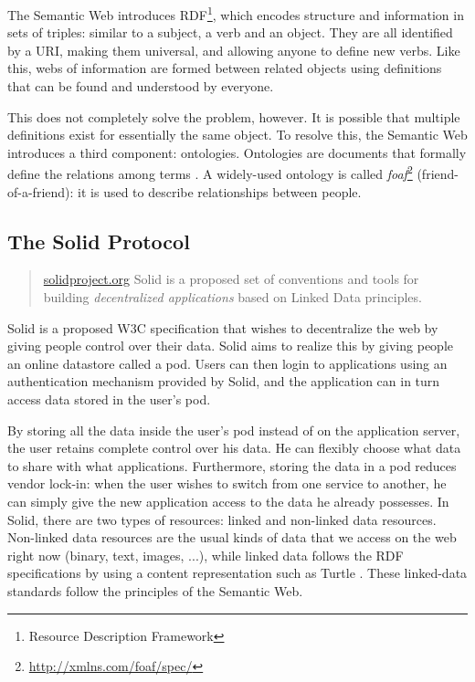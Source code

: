 \noindent The Semantic Web introduces RDF\footnote{Resource Description Framework}, which encodes structure and information in sets of triples: similar to a subject, a verb and an object. They are all identified by a URI, making them universal, and allowing anyone to define new verbs. Like this, webs of information are formed between related objects using definitions that can be found and understood by everyone.

This does not completely solve the problem, however. It is possible that multiple definitions exist for essentially the same object. To resolve this, the Semantic Web introduces a third component: ontologies. Ontologies are documents that formally define the relations among terms \citep{semantic-web}. A widely-used ontology is called \textit{foaf}\footnote{\url{ http://xmlns.com/foaf/spec/}} (friend-of-a-friend): it is used to describe relationships between people.


\subsection{The Solid Protocol}
\begin{quote}{\href{https://solidproject.org}{solidproject.org}}
    Solid is a proposed set of conventions and tools for building \textit{decentralized applications} based on Linked Data principles.
\end{quote}
\noindent Solid \citep{solid} is a proposed W3C specification that wishes to decentralize the web by giving people control over their data. Solid aims to realize this by giving people an online datastore called a pod. Users can then login to applications using an authentication mechanism provided by Solid, and the application can in turn access data stored in the user's pod.

By storing all the data inside the user's pod instead of on the application server, the user retains complete control over his data. He can flexibly choose what data to share with what applications. Furthermore, storing the data in a pod reduces vendor lock-in: when the user wishes to switch from one service to another, he can simply give the new application access to the data he already possesses. 
In Solid, there are two types of resources: linked and non-linked data resources. Non-linked data resources are the usual kinds of data that we access on the web right now (binary, text, images, ...), while linked data follows the 
 RDF specifications by using a content representation such as Turtle \citep{turtle}. These linked-data standards follow the principles of the Semantic Web.

